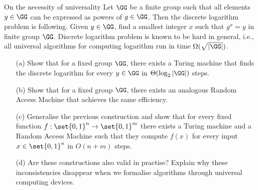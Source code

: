 \documentclass{crypto-exercise}
\author{Sven Laur}
\begin{document}
\begin{exercise}{On the necessity of universality}
Let $\GG$ be a finite group such that all elements $y \in \GG$ can be expressed
as powers of $g \in \GG$. Then the discrete logarithm problem is following.
Given $y \in \GG$, find a smallest integer $x$ such that $g^x = y$ in finite group
$\GG$. Discrete logarithm problem is known to be hard in general, i.e., all
universal algorithms for computing logarithm run in time $\Omega(\sqrt{|\GG|})$.
\begin{enumerate}
\item[(a)] Show that for a fixed group $\GG$, there exists a Turing machine that
finds the discrete logarithm for every $y \in \GG$ in $\Theta(\log_2 |\GG|)$ steps.
\item[(b)] Show that for a fixed group $\GG$, there exists an analogous Random
Access Machine that achieves the same efficiency.
\item[(c)] Generalise the previous construction and show that for every fixed
function $f : \set{0, 1 } ^n \to \set{0, 1}^m$ there exists a Turing machine and
a Random Access Machine such that they compute $f(x)$ for every
input $x \in \set{0, 1 }^n$ in $O(n + m)$ steps.
\item[(d)] Are these constructions also valid in practise? Explain why these
inconsistencies disappear when we formalise algorithms through universal computing devices. 
\end{enumerate}
\end{exercise}
\end{document}

